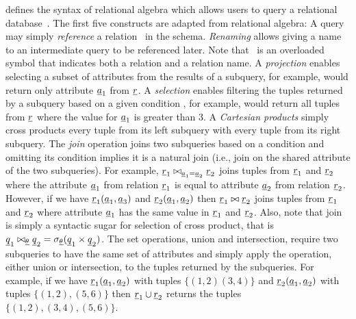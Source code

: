  defines the syntax of 
relational algebra which allows users to query a relational database~\cite{AliceBook}.
%
The first five constructs are adapted from relational algebra:
%
A query may simply \emph{reference} a relation \pRel\ in the schema.
\emph{Renaming} allows giving a name to an intermediate query to be referenced
 later. Note that \pRel\ is an overloaded symbol that indicates both a relation
 and a relation name. 
%
A \emph{projection} enables selecting a subset of attributes from the results
of a subquery, for example, \vPrj[\pAtt_1]{\pRel} would return only attribute $\pAtt_1$
from $\pRel$.
%
A \emph{selection} enables filtering the tuples returned by a subquery based on a
given condition \pCond, for example, \vSel[\pAtt_1 > 3]{\pRel} would return all tuples
from $\pRel$ where the value for $\pAtt_1$ is greater than 3.
%
A \emph{Cartesian products} simply cross products every tuple from its
left subquery with every tuple from its right subquery. 
%
The \emph{join} operation joins two subqueries based on a condition and
omitting its condition implies it is a natural join (i.e., join on the
shared attribute of the two subqueries).
For example, $\pRel_1 \bowtie_{\pAtt_1 = \pAtt_2} \pRel_2$ joins tuples from $\pRel_1$ 
and $\pRel_2$ where the attribute $\pAtt_1$ from relation $\pRel_1$ is equal to
attribute $\pAtt_2$ from relation $\pRel_2$. However, if we have $\pRel_1(\pAtt_1, \pAtt_3)$
and $\pRel_2 (\pAtt_1, \pAtt_2)$ then
$\pRel_1 \bowtie \pRel_2$ joins tuples from $\pRel_1$ and $\pRel_2$ where
attribute $\pAtt_1$ has the same value in $\pRel_1$ and $\pRel_2$. 
%
Also, note that join is simply a syntactic sugar for selection of cross product,
that is $\pQ_1 \bowtie_{\pCond} \pQ_2 = \vSel [\pCond] {(\pQ_1 \times \pQ_2)}$.
%
The set operations, union and intersection, require two subqueries to have the same set of attributes
and simply apply the operation, either union or intersection, to the tuples returned by
the subqueries.
For example, if we have $\pRel_1(\pAtt_1, \pAtt_2)$ with 
tuples $\{(1,2)(3,4)\}$
and $\pRel_2(\pAtt_1, \pAtt_2)$ with tuples $\{(1,2),(5,6) \}$
then $\pRel_1 \cup \pRel_2 $ returns the tuples $\{(1,2), (3,4), (5,6)\}$.

%
